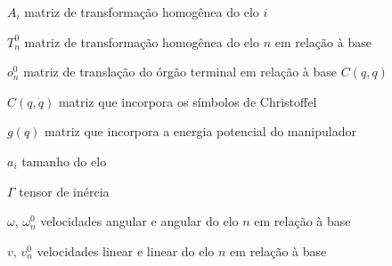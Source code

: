 \begin{simbolos}
	\item[$ A_i $]		matriz de transformação homogênea do elo $i$
	\item[$ T_n^0 $]	matriz de transformação homogênea do elo $n$ em relação à base
	\item[$ o_n^0 $]	matriz de translação do órgão terminal em relação à base $C(q, q)$
	\item[$ C(q,\dot{q}) $]	matriz que incorpora os símbolos de Christoffel
	\item[$ g(q) $]		matriz que incorpora a energia potencial do manipulador
	\item[$ a_i $]		tamanho do elo
	\item[$ \Gamma $]	tensor de inércia
	\item[$ \omega $, $\omega_n^0$]		velocidades angular e angular do elo $n$ em relação à base
	\item[$ v $, $v_n^0$]		velocidades linear e linear do elo $n$ em relação à base
\end{simbolos}